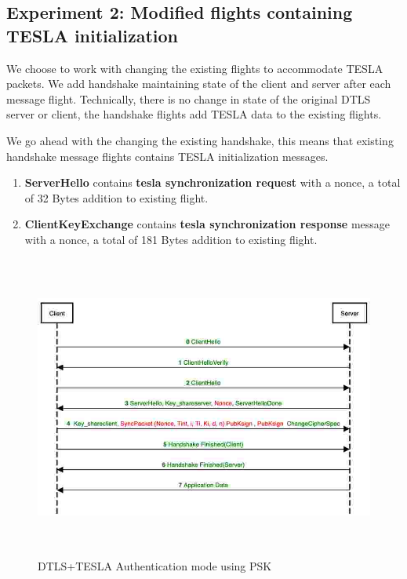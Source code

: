 \subsection{Experiment 2: Modified flights containing TESLA initialization}
We choose to work with changing the existing flights to accommodate TESLA packets. We add handshake maintaining state of the client and server after each message flight. Technically, there is no change in state of the original DTLS server or client, the handshake flights add TESLA data to the existing flights. 

We go ahead with the changing the existing handshake, this means that existing handshake message flights contains TESLA initialization messages.

\begin{enumerate}
    \item \textbf{ServerHello} contains \textbf{tesla synchronization request} with a nonce, a total of 32 Bytes addition to existing flight.
    
    \item \textbf{ClientKeyExchange} contains \textbf{tesla synchronization response} message with a nonce, a total of 181 Bytes addition to existing flight.
    
\end{enumerate}  


 \begin{figure}[H]
    \centering
    \includegraphics[height=10cm,width=16cm]{figures/hs.jpg}
    \caption{DTLS+TESLA Authentication mode using PSK}
    \label{hs}
    \end{figure}
    
